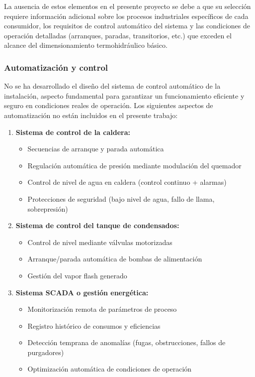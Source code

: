 La ausencia de estos elementos en el presente proyecto se debe a que su selección requiere información adicional sobre los procesos industriales específicos de cada consumidor, los requisitos de control automático del sistema y las condiciones de operación detalladas (arranques, paradas, transitorios, etc.) que exceden el alcance del dimensionamiento termohidráulico básico.

\subsubsection{Automatización y control}
\label{subsubsec:limitaciones-automatizacion}

No se ha desarrollado el diseño del sistema de control automático de la instalación, aspecto fundamental para garantizar un funcionamiento eficiente y seguro en condiciones reales de operación. Los siguientes aspectos de automatización no están incluidos en el presente trabajo:

\begin{enumerate}[label=\arabic*., leftmargin=2em]
	\item \textbf{Sistema de control de la caldera:}
	      \begin{itemize}[noitemsep]
		      \item Secuencias de arranque y parada automática
		      \item Regulación automática de presión mediante modulación del quemador
		      \item Control de nivel de agua en caldera (control continuo + alarmas)
		      \item Protecciones de seguridad (bajo nivel de agua, fallo de llama, sobrepresión)
	      \end{itemize}

	\item \textbf{Sistema de control del tanque de condensados:}
	      \begin{itemize}[noitemsep]
		      \item Control de nivel mediante válvulas motorizadas
		      \item Arranque/parada automática de bombas de alimentación
		      \item Gestión del vapor flash generado
	      \end{itemize}

	\item \textbf{Sistema SCADA o gestión energética:}
	      \begin{itemize}[noitemsep]
		      \item Monitorización remota de parámetros de proceso
		      \item Registro histórico de consumos y eficiencias
		      \item Detección temprana de anomalías (fugas, obstrucciones, fallos de purgadores)
		      \item Optimización automática de condiciones de operación
	      \end{itemize}
\end{enumerate}

